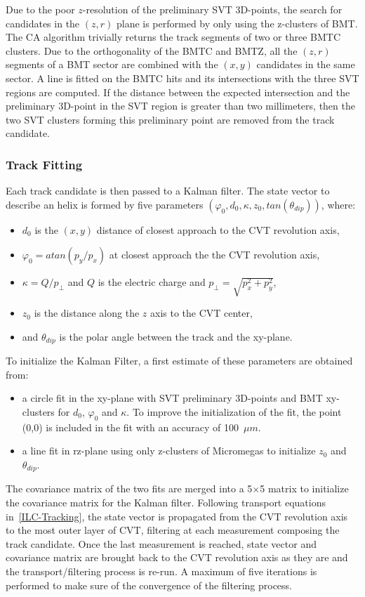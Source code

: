 Due to the poor $z$-resolution of the preliminary SVT 3D-points, the search for candidates in the $(z,r)$ plane is
performed by only using
the z-clusters of BMT. The CA algorithm trivially returns the track segments of two or three BMTC clusters.
Due to the orthogonality of the BMTC and BMTZ, all the $(z,r)$ segments of a BMT sector are combined with the $(x,y)$
candidates in the same sector. A line is fitted on the BMTC hits and its intersections with the three SVT regions are
computed. If the distance between the expected intersection and the preliminary 3D-point in the SVT region is greater
than two millimeters, then the two SVT clusters forming this preliminary point are removed from the track candidate.

\subsubsection{Track Fitting}

Each track candidate is then passed to a Kalman filter. The state vector to describe an helix is formed by five
parameters $(\varphi_0, d_0, \kappa, z_0, tan(\theta_{dip}))$, where:
\begin{itemize}
\item $d_0$ is the $(x,y)$ distance of closest approach to the CVT revolution axis,
\item $\varphi_0 = atan(p_y/p_x)$ at closest approach the the CVT revolution axis,
\item $\kappa=Q/p_\perp$ and $Q$ is the electric charge and $p_\perp=\sqrt{p_x^2+p_y^2}$,
\item $z_0$ is the distance along the $z$ axis to the CVT center,
\item and $\theta_{dip}$ is the polar angle between the track and the xy-plane.
\end{itemize}

To initialize the Kalman Filter, a first estimate of these parameters are obtained from:
\begin{itemize}
\item a circle fit in the xy-plane with SVT preliminary 3D-points and BMT xy-clusters for $d_0$, $\varphi_0$ and
$\kappa$. To improve the initialization of the fit, the point (0,0) is included in the fit with an accuracy of 100~$\mu
m$.
\item a line fit in rz-plane using only z-clusters of Micromegas to initialize $z_0$ and $\theta_{dip}$.
\end{itemize}
The covariance matrix of the two fits are merged into a 5$\times$5 matrix to initialize the covariance matrix for the
Kalman filter. Following transport equations in~\ref{ILC-Tracking}, the state vector is propagated from the CVT
revolution axis to the most outer layer of CVT, filtering at each measurement composing the track candidate. Once the
last measurement is reached, state vector and covariance matrix are brought back to the CVT revolution axis as they are
and the transport/filtering process is re-run. A maximum of five iterations is performed to make sure of the
convergence of the filtering process.


